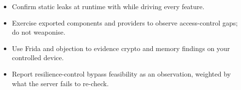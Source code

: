 \begin{summarybox}
\begin{itemize}
\item Confirm static leaks at runtime with  while driving every feature.
\item Exercise exported components and providers to observe access-control gaps; do not weaponise.
\item Use Frida and objection to evidence crypto and memory findings on your controlled device.
\item Report resilience-control bypass feasibility as an observation, weighted by what the server fails to re-check.
\end{itemize}
\end{summarybox}

